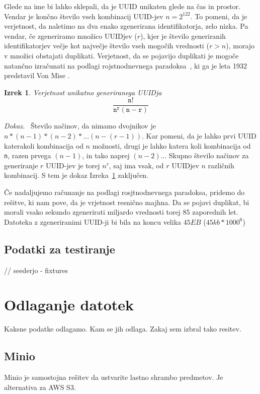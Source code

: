 \documentclass[a4paper, 12pt]{book}
\newtheorem{izrek}{Izrek}[chapter]
\newenvironment{dokaz}{\emph{Dokaz.}\ }{\hspace{\fill}{$\Box$}}
\begin{document}
Glede na ime bi lahko sklepali, da je UUID unikaten glede na čas in prostor. Vendar je končno število vseh kombinacij UUID-jev $n=2^{122}$. To pomeni, da je verjetnost, da naletimo na dva enako zgenerirana identifikatorja, zelo nizka.
Pa vendar, če zgeneriramo množico UUIDjev ($r$), kjer je število generiranih identifikatorjev večje kot največje število vseh mogočih vrednosti ($r > n$), morajo v množici obstajati duplikati. Verjetnost, da se pojavijo duplikati je mogoče natančno izračunati na podlagi rojstnodnevnega paradoksa~\cite{birthday-problem-what-is}, ki ga je leta 1932 predstavil Von Mise \cite{birthday-problem-inventor}.

\begin{izrek}
\label{iz:1}
Verjetnost unikatno generiranega UUIDja
\begin{equation}
\mathtt{\frac{n!}{n^{r}(n-r)}}
\label{eq:1}
\end{equation}
\end{izrek}

\begin{dokaz}
Število načinov, da nimamo dvojnikov je $n*(n-1)*(n-2)* …(n-(r-1))$. Kar pomeni, da je lahko prvi UUID katerakoli kombinacija od $n$ možnosti, drugi je lahko katera koli kombinacija od \verb=n=, razen prvega $(n-1)$, in tako naprej $(n-2)$... Skupno število načinov za generiranje $r$ UUID-jev je torej $n^r$, saj ima vsak, od $r$ UUIDjev $n$ različnih kombinacij.
S tem je dokaz Izreka~\ref{iz:1} zaključen.
\end{dokaz}

Če nadaljujemo računanje na podlagi rosjtnodnevnega paradoksa, pridemo do rešitve, ki nam pove, da je vrjetnost resnično majhna. Da se pojavi duplikat, bi morali vsako sekundo zgenerirati miljardo vrednosti torej 85 zaporednih let. Datoteka z zgeneriranimi UUID-ji bi bila na koncu velika $45EB$ ($45kb*1000^6$) \cite{uuid-collisions}


\subsection{Podatki za testiranje}
// seederjo - fixtures

\clearpage
\section{Odlaganje datotek}
Kaksne podatke odlagamo. Kam se jih odlaga. Zakaj sem izbral tako resitev.
\subsection{Minio}
Minio je samostojna rešitev da ustvarite lastno shrambo predmetov. Je alternativa za AWS S3.
\end{document}
